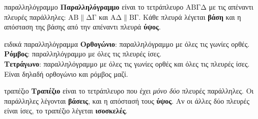 \begin{orismos}{παραλληλόγραμμο}
\textbf{Παραλληλόγραμμο} είναι το τετράπλευρο $\mathrm{ΑΒΓΔ}$ με τις απέναντι πλευρές παράλληλες: $\mathrm{ΑΒ}\parallel\mathrm{ΔΓ}$ και $\mathrm{ΑΔ}\parallel\mathrm{ΒΓ}$. Κάθε πλευρά λέγεται \textbf{βάση} και η απόσταση της βάσης από την απέναντι πλευρά \textbf{ύψος}.
\end{orismos}

\begin{center}
\end{center}

\begin{orismos}{ειδικά παραλληλόγραμμα}
\textbf{Ορθογώνιο}: παραλληλόγραμμο με όλες τις γωνίες ορθές.\\
\textbf{Ρόμβος}: παραλληλόγραμμο με όλες τις πλευρές ίσες.\\
\textbf{Τετράγωνο}: παραλληλόγραμμο με όλες τις γωνίες ορθές και όλες τις πλευρές ίσες. Είναι δηλαδή ορθογώνιο και ρόμβος μαζί.
\end{orismos}

\begin{orismos}{τραπέζιο}
\textbf{Τραπέζιο} είναι το τετράπλευρο που έχει \emph{μόνο δύο} πλευρές παράλληλες. Οι παράλληλες λέγονται \textbf{βάσεις}, και η απόστασή τους \textbf{ύψος}. Αν οι άλλες δύο πλευρές είναι ίσες, το τραπέζιο λέγεται \textbf{ισοσκελές}.
\end{orismos}

